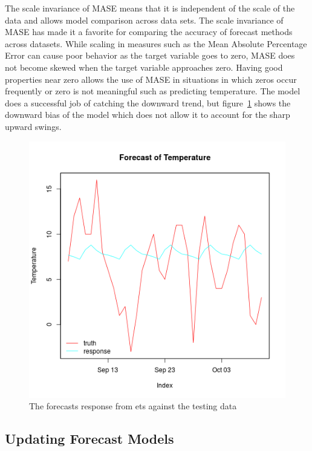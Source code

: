 \documentclass[12pt]{article}%
\theoremstyle{definition}
\begin{document}
The scale invariance of MASE means that it is independent of the scale of the data and allows model comparison across data sets. The scale invariance of MASE has made it a favorite for comparing the accuracy of forecast methods~\cite{noteMase} across datasets. While scaling in measures such as the Mean Absolute Percentage Error can cause poor behavior as the target variable goes to zero, MASE does not become skewed when the target variable approaches zero. Having good properties near zero allows the use of MASE in situations in which zeros occur frequently or zero is not meaningful such as predicting temperature. The model does a successful job of catching the downward trend, but figure~\ref{fig:ets_train} shows the downward bias of the model which does not allow it to account for the sharp upward swings.

\singlespacing


\doublespacing

\begin{figure}[h!]
\includegraphics[width=\linewidth]{paper_figures/plot_ets_train.png}
\centering
\caption{The forecasts response from ets against the testing data}
\label{fig:ets_train}
\end{figure}

\subsection{Updating Forecast Models}
\end{document}
